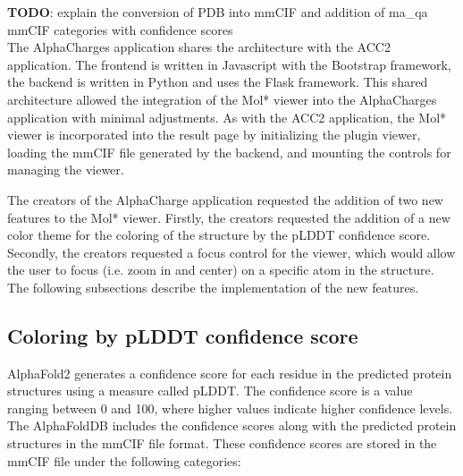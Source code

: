 \documentclass[
  digital,     %
  oneside,     %
  nosansbold,  %
  nocolorbold, %
  lof,         %
  lot,         %
]{fithesis4}
\begin{document}
\textbf{TODO}: explain the conversion of PDB into mmCIF and addition of ma\_qa mmCIF categories with confidence scores \\

The AlphaCharges application shares the architecture with the ACC2 application. The frontend is written in Javascript with the Bootstrap framework, the backend is written in Python and uses the Flask framework. This shared architecture allowed the integration of the Mol* viewer into the AlphaCharges application with minimal adjustments. As with the ACC2 application, the Mol* viewer is incorporated into the result page by initializing the plugin viewer, loading the mmCIF file generated by the backend, and mounting the controls for managing the viewer.

The creators of the AlphaCharge application requested the addition of two new features to the Mol* viewer. Firstly, the creators requested the addition of a new color theme for the coloring of the structure by the pLDDT confidence score. Secondly, the creators requested a focus control for the viewer, which would allow the user to focus (i.e. zoom in and center) on a specific atom in the structure. The following subsections describe the implementation of the new features.



\subsection{Coloring by pLDDT confidence score}

AlphaFold2 generates a confidence score for each residue in the predicted protein structures using a measure called pLDDT. The confidence score is a value ranging between 0 and 100, where higher values indicate higher confidence levels. \cite{varadi2021alphafold} The AlphaFoldDB includes the confidence scores along with the predicted protein structures in the mmCIF file format. These confidence scores are stored in the mmCIF file under the following categories:
\end{document}
